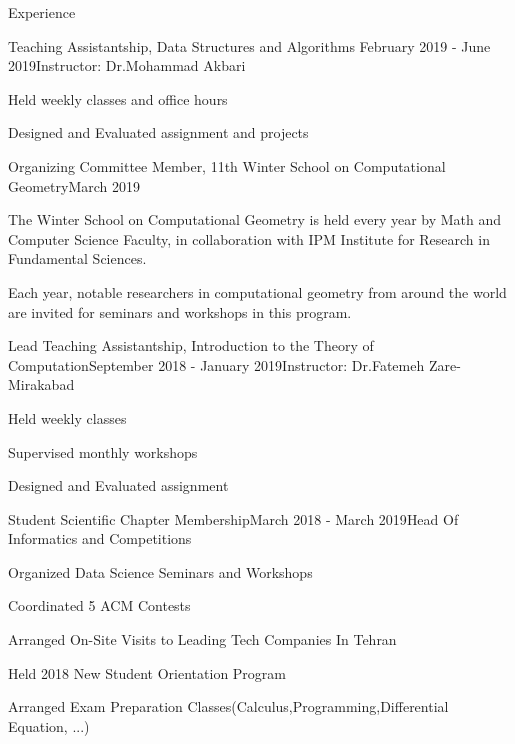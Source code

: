 \documentclass{resume} %
\begin{document}
\begin{rSection}{Experience }

\begin{rSubsection}{Teaching Assistantship, Data Structures and Algorithms }{February 2019 - June 2019}{Instructor: Dr.Mohammad Akbari}{ }
\item 
Held weekly classes and office hours
\item 
Designed and Evaluated assignment and projects
\end{rSubsection}
\begin{rSubsection}{Organizing Committee Member, 11th Winter School on Computational Geometry}{March 2019}{}{ }
	\item 	The Winter School on Computational Geometry is held every year by Math and Computer Science Faculty, in collaboration with IPM Institute for Research in Fundamental Sciences.
	\item Each year, notable researchers in computational geometry from around the world are invited for seminars and workshops in this program.
\end{rSubsection}



\begin{rSubsection}{Lead Teaching Assistantship, Introduction to the Theory of Computation}{September 2018 - January 2019}{Instructor: Dr.Fatemeh Zare-Mirakabad}{ }
\item Held weekly classes 
\item Supervised monthly workshops
\item Designed and Evaluated assignment 

\end{rSubsection}


\begin{rSubsection}{Student Scientific Chapter Membership}{March 2018 - March 2019}{Head Of Informatics and Competitions}{ }
\item Organized Data Science Seminars and Workshops
\item Coordinated 5 ACM Contests
\item Arranged On-Site Visits to Leading Tech Companies In Tehran
\item Held 2018 New Student Orientation Program 
\item Arranged Exam Preparation Classes(Calculus,Programming,Differential Equation, ...)
\end{rSubsection}


\end{rSection}
\end{document}
